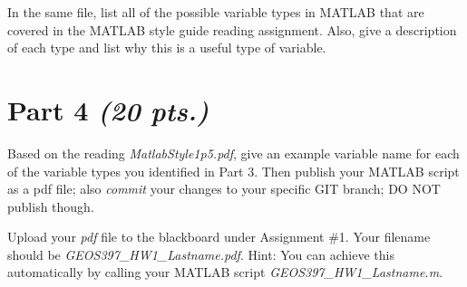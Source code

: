 \documentclass[10pt]{article}
\begin{document}
\noindent In the same file, list all of the possible variable types in MATLAB that are covered in the MATLAB style guide reading assignment. Also, give a description of each type and list why this is a useful type of variable.

\section*{Part 4 \textit{(20 pts.)}}

\noindent Based on the reading \textit{MatlabStyle1p5.pdf}, give an example variable name for each of the variable types you identified in Part 3. Then publish your MATLAB script as a pdf file; also \textit{commit} your changes to your specific GIT branch; DO NOT publish though.

\vspace{2\baselineskip}
\vfill

Upload your \textit{pdf} file to the blackboard under Assignment \#1. Your filename should be \textit{GEOS397\_HW1\_Lastname.pdf}. Hint: You can achieve this automatically by calling your MATLAB script \textit{GEOS397\_HW1\_Lastname.m}.
\end{document}
